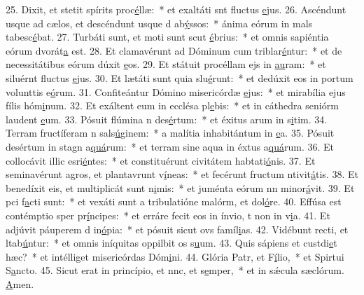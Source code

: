 25. Dixit, et stetit spírits proc\uline{é}llæ:~* et exaltáti snt fluctus \uline{e}jus.
26. Ascéndunt usque ad cælos, et descéndunt usque d ab\uline{ý}ssos:~* ánima eórum in mals tabesc\uline{é}bat.
27. Turbáti sunt, et moti sunt scut \uline{é}brius:~* et omnis sapiéntia eórum dvorát\uline{a} est.
28. Et clamavérunt ad Dóminum cum triblar\uline{é}ntur:~* et de necessitátibus eórum dúxit \uline{e}os.
29. Et státuit procéllam ejs in \uline{au}ram:~* et siluérnt fluctus \uline{e}jus.
30. Et lætáti sunt quia slu\uline{é}runt:~* et dedúxit eos in portum volunttis e\uline{ó}rum.
31. Confiteántur Dómino misericórdæ \uline{e}jus:~* et mirabília ejus fílis hóm\uline{i}num.
32. Et exáltent eum in ecclésa pl\uline{e}bis:~* et in cáthedra seniórm laudent \uline{e}um.
33. Pósuit flúmina n des\uline{é}rtum:~* et éxitus arum in s\uline{i}tim.
34. Terram fructíferam n sals\uline{ú}ginem:~* a malítia inhabitántum in \uline{e}a.
35. Pósuit desértum in stagn a\uline{quá}rum:~* et terram sine aqua in éxtus a\uline{quá}rum.
36. Et collocávit illic esri\uline{é}ntes:~* et constituérunt civitátem habtati\uline{ó}nis.
37. Et seminavérunt agros, et plantavrunt v\uline{í}neas:~* et fecérunt fructum ntivit\uline{á}tis.
38. Et benedíxit eis, et multiplicát sunt n\uline{i}mis:~* et juménta eórum nn minor\uline{á}vit.
39. Et pci f\uline{a}cti sunt:~* et vexáti sunt a tribulatióne malórm, et dol\uline{ó}re.
40. Effúsa est contémptio sper pr\uline{í}ncipes:~* et erráre fecit eos in ínvio, t non in v\uline{i}a.
41. Et adjúvit páuperem d in\uline{ó}pia:~* et pósuit sicut ovs famíl\uline{i}as.
42. Vidébunt recti, et ltab\uline{ú}ntur:~* et omnis iníquitas oppilbit os s\uline{u}um.
43. Quis sápiens et custdi\uline{e}t hæc?~* et intélliget misericórdas Dóm\uline{i}ni.
44. Glória Patr, et F\uline{í}lio,~* et Spirtui S\uline{a}ncto.
45. Sicut erat in princípio, et nnc, et s\uline{e}mper,~* et in sǽcula sæclórum. \uline{A}men.

